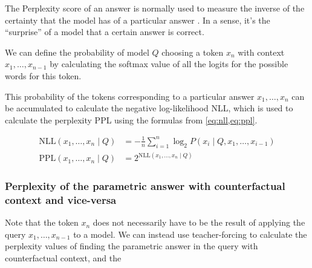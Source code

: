 The Perplexity score of an answer is normally used to measure the inverse of the certainty that the model has of a particular answer \citep{fewshotlearners,retro}.
In a sense, it's the ``surprise'' of a model that a certain answer is correct.

We can define the probability of model $Q$ choosing a token $x_n$ with context $x_1, \dots, x_{n - 1}$ by calculating the softmax value of all the logits for the possible words for this token.

This probability of the tokens corresponding to a particular answer $x_1, \dots, x_n$ can be accumulated to calculate the negative log-likelihood NLL, which is used to calculate the perplexity PPL using the formulas from \cref{eq:nll,eq:ppl}.

\begin{align}
	\text{NLL} \left( x_1, \dots, x_n \mid Q \right) &= - \frac{1}{n} \sum^n_{i = 1} \log_2 P \left( x_i \mid Q, x_1, \dots, x_{i - 1} \right) \label{eq:nll} \\
	\text{PPL} \left( x_1, \dots, x_n \mid Q \right) &= {2 ^ {\text{NLL} \left( x_1, \dots, x_n \mid Q \right)}} \label{eq:ppl}
\end{align}

\subsubsection{Perplexity of the parametric answer with counterfactual context and vice-versa}

Note that the token $x_n$ does not necessarily have to be the result of applying the query $x_1, \dots, x_{n - 1}$ to a model.
We can instead use teacher-forcing \citep{teacher_forcing} to calculate the perplexity values of finding the parametric answer in the query with counterfactual context, and the 
